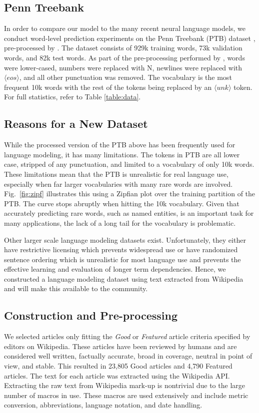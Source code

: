 \subsection{Penn Treebank} In order to compare our model to the many recent neural language models, we conduct word-level prediction experiments on the Penn Treebank (PTB) dataset \cite{Marcus1993}, pre-processed by \citet{Mikolov2010}.
The dataset consists of 929k training words, 73k validation words, and 82k test words. As part of the pre-processing performed by \citet{Mikolov2010}, words were lower-cased, numbers were replaced with N, newlines were replaced with $\langle eos \rangle$, and all other punctuation was removed. The vocabulary is the most frequent 10k words with the rest of the tokens being replaced by an $\langle unk \rangle$ token. For full statistics, refer to Table \ref{table:data}.

\subsection{Reasons for a New Dataset}

While the processed version of the PTB above has been frequently used for language modeling, it has many limitations. The tokens in PTB are all lower case, stripped of any punctuation, and limited to a vocabulary of only 10k words. These limitations mean that the PTB is unrealistic for real language use, especially when far larger vocabularies with many rare words are involved. Fig.~\ref{fig:zipf} illustrates this using a Zipfian plot over the training partition of the PTB. The curve stops abruptly when hitting the 10k vocabulary. Given that accurately predicting rare words, such as named entities, is an important task for many applications, the lack of a long tail for the vocabulary is problematic.

Other larger scale language modeling datasets exist. Unfortunately, they either have restrictive licensing which prevents widespread use or have randomized sentence ordering \cite{Chelba2013} which is unrealistic for most language use and prevents the effective learning and evaluation of longer term dependencies. Hence, we constructed a language modeling dataset using text extracted from Wikipedia and will make this available to the community.

\subsection{Construction and Pre-processing} We selected articles only fitting the \emph{Good} or \emph{Featured} article criteria specified by editors on Wikipedia. These articles have been reviewed by humans and are considered well written, factually accurate, broad in coverage, neutral in point of view, and stable. This resulted in 23,805 Good articles and 4,790 Featured articles. The text for each article was extracted using the Wikipedia API. Extracting the raw text from Wikipedia mark-up is nontrivial due to the large number of macros in use. These macros are used extensively and include metric conversion, abbreviations, language notation, and date handling.


